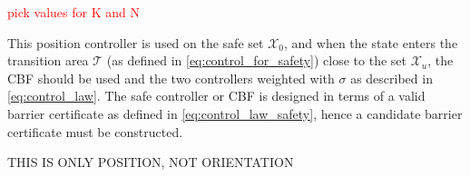 \textcolor{red}{pick  values for K and N }

This position controller is used on the safe set $\mathcal{X}_0$, and when the state enters the transition area $\mathcal{T}$ (as defined in \autoref{eq:control_for_safety}) close to the set $\mathcal{X}_u$, the CBF should be used and the two controllers weighted with $\sigma$ as described in \autoref{eq:control_law}. The safe controller or CBF is designed in terms of a valid barrier certificate as defined in \autoref{eq:control_law_safety}, hence a candidate barrier certificate must be constructed.




THIS IS ONLY POSITION, NOT ORIENTATION

